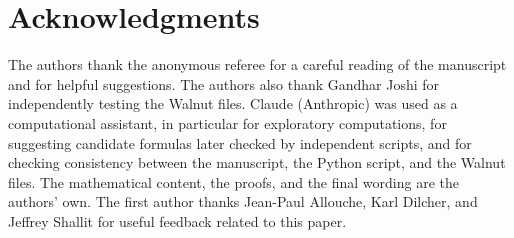 \documentclass[12pt,reqno]{article}
\theoremstyle{plain}
\theoremstyle{definition}
\theoremstyle{remark}
\begin{document}
\section{Acknowledgments}
The authors thank the anonymous referee for a careful reading of the manuscript and for helpful suggestions. The authors also thank Gandhar Joshi for independently testing the Walnut files. Claude (Anthropic) was used as a computational assistant, in particular for exploratory computations, for suggesting candidate formulas later checked by independent scripts, and for checking consistency between the manuscript, the Python script, and the Walnut files. The mathematical content, the proofs, and the final wording are the authors' own. The first author thanks Jean-Paul Allouche, Karl Dilcher, and Jeffrey Shallit for useful feedback related to this paper.
\end{document}
